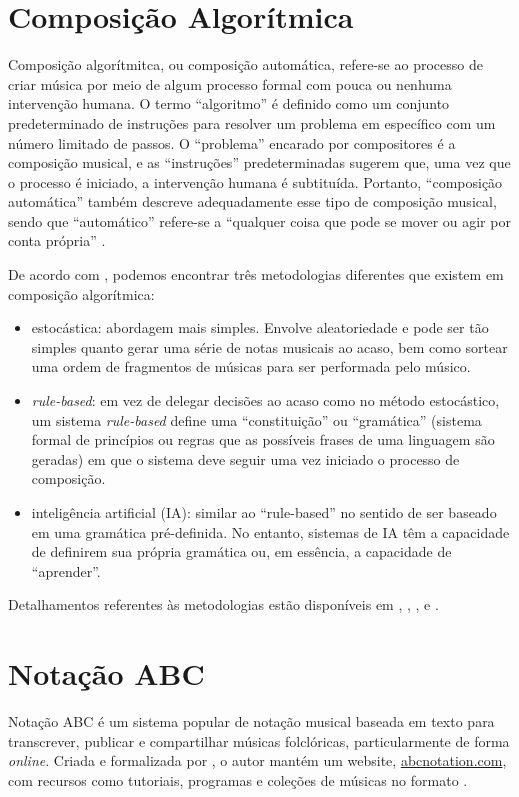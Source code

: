 \documentclass{automatextcc}
\begin{document}
\section{Composição Algorítmica}

Composição algorítmitca, ou composição automática, refere-se ao processo de criar música por meio de algum processo formal com pouca ou nenhuma intervenção humana. O termo ``algoritmo'' é definido como um conjunto predeterminado de instruções para resolver um problema em específico com um número limitado de passos. O ``problema'' encarado por compositores é a composição musical, e as ``instruções'' predeterminadas sugerem que, uma vez que o processo é iniciado, a intervenção humana é subtituída. Portanto, ``composição automática'' também descreve adequadamente esse tipo de composição musical, sendo que ``automático'' refere-se a ``qualquer coisa que pode se mover ou agir por conta própria'' \citep{alpern1995, maurer}.

De acordo com \citet{maurer}, podemos encontrar três metodologias diferentes que existem em composição algorítmica: 

\begin{itemize}
    \item estocástica: abordagem mais simples. Envolve aleatoriedade e pode ser tão simples quanto gerar uma série de notas musicais ao acaso, bem como sortear uma ordem de fragmentos de músicas para ser performada pelo músico.
    \item \textit{rule-based}: em vez de delegar decisões ao acaso como no método estocástico, um sistema \textit{rule-based} define uma ``constituição'' ou ``gramática'' (sistema formal de princípios ou regras que as possíveis frases de uma linguagem são geradas) em que o sistema deve seguir uma vez iniciado o processo de composição. 
    \item inteligência artificial (IA): similar ao ``rule-based'' no sentido de ser baseado em uma gramática pré-definida. No entanto, sistemas de IA têm a capacidade de definirem sua própria gramática ou, em essência, a capacidade de ``aprender''.
\end{itemize}
Detalhamentos referentes às metodologias estão disponíveis em \citet{alpern1995}, \citet{maurer}, \citet{nierhaus2009}, \citet{fernandez2013} e \citet{hernandez2021}.  


\section{Notação ABC}
Notação ABC é um sistema popular de notação musical baseada em texto para transcrever, publicar e compartilhar músicas folclóricas, particularmente de forma \textit{online}. Criada e formalizada por \citet{walshaw1993}, o autor mantém um website, \url{abcnotation.com}, com recursos como tutoriais, programas e coleções de músicas no formato \citep{walshaw2014}.
\end{document}
